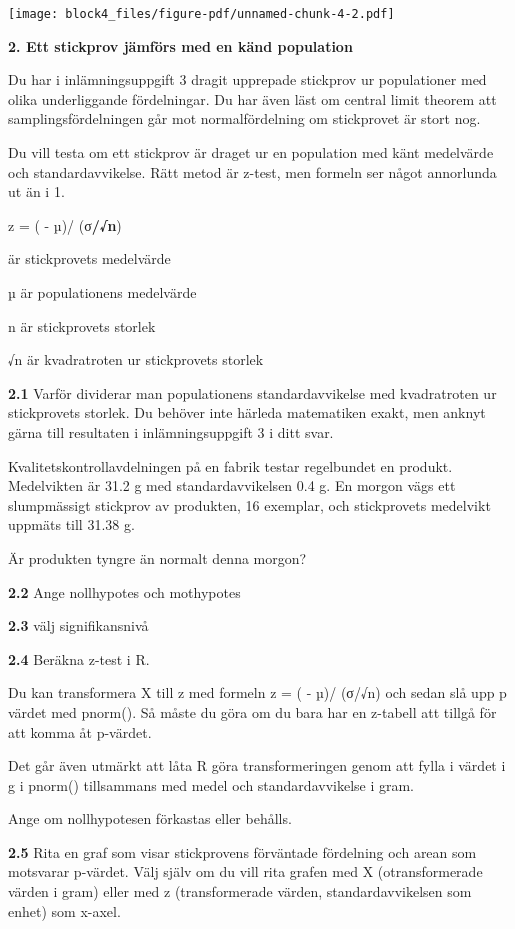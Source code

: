 \documentclass[
  letterpaper,
  DIV=11,
  numbers=noendperiod]{scrartcl}
\begin{document}
\texttt{[image: block4\_files/figure-pdf/unnamed-chunk-4-2.pdf]}

\textbf{2. Ett stickprov jämförs med en känd population}

Du har i inlämningsuppgift 3 dragit upprepade stickprov ur populationer
med olika underliggande fördelningar. Du har även läst om central limit
theorem att samplingsfördelningen går mot normalfördelning om
stickprovet är stort nog.

Du vill testa om ett stickprov är draget ur en population med känt
medelvärde och standardavvikelse. Rätt metod är z-test, men formeln ser
något annorlunda ut än i 1.

z = ( - µ)/ (σ\textbf{/√n})

är stickprovets medelvärde

µ är populationens medelvärde

n är stickprovets storlek

√n är kvadratroten ur stickprovets storlek

\textbf{2.1} Varför dividerar man populationens standardavvikelse med
kvadratroten ur stickprovets storlek. Du behöver inte härleda
matematiken exakt, men anknyt gärna till resultaten i inlämningsuppgift
3 i ditt svar.

Kvalitetskontrollavdelningen på en fabrik testar regelbundet en produkt.
Medelvikten är 31.2 g med standardavvikelsen 0.4 g. En morgon vägs ett
slumpmässigt stickprov av produkten, 16 exemplar, och stickprovets
medelvikt uppmäts till 31.38 g.

Är produkten tyngre än normalt denna morgon?

\textbf{2.2} Ange nollhypotes och mothypotes

\textbf{2.3} välj signifikansnivå

\textbf{2.4} Beräkna z-test i R.

Du kan transformera X till z med formeln z = ( - µ)/ (σ/√n) och sedan
slå upp p värdet med pnorm(). Så måste du göra om du bara har en
z-tabell att tillgå för att komma åt p-värdet.

Det går även utmärkt att låta R göra transformeringen genom att fylla i
värdet i g i pnorm() tillsammans med medel och standardavvikelse i gram.

Ange om nollhypotesen förkastas eller behålls.

\textbf{2.5} Rita en graf som visar stickprovens förväntade fördelning
och arean som motsvarar p-värdet. Välj själv om du vill rita grafen med
X (otransformerade värden i gram) eller med z (transformerade värden,
standardavvikelsen som enhet) som x-axel.
\end{document}
